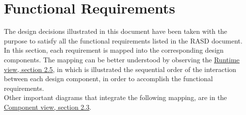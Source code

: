 \section{Functional Requirements}
The design decisions illustrated in this document have been taken with the purpose to satisfy all the functional requirements listed in the RASD document. In this section, each requirement is mapped into the corresponding design components.
The mapping can be better understood by observing the \hyperlink{RV}{\underline{Runtime view, section 2.5}}, in which is illustrated the sequential order of the interaction between each design component, in order to accomplish the functional requirements.\\
Other important diagrams that integrate the following mapping, are in the\\ \hyperlink{CV}{\underline{Component view, section 2.3}}.

